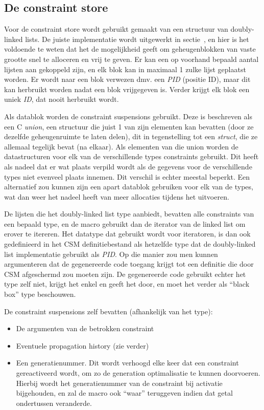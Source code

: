 \subsection{De constraint store} \label{sec:constore}

Voor de constraint store wordt gebruikt gemaakt van een structuur van doubly-linked lists. De juiste implementatie wordt uitgewerkt in sectie~\label{ssec:impl-rt-dll}, en hier is het voldoende te weten dat het de mogelijkheid geeft om geheugenblokken van vaste grootte snel te alloceren en vrij te geven. Er kan een op voorhand bepaald aantal lijsten aan gekoppeld zijn, en elk blok kan in maximaal 1 zulke lijst geplaatst worden. Er wordt naar een blok verwezen dmv. een {\em PID} (positie ID), maar dit kan herbruikt worden nadat een blok vrijgegeven is. Verder krijgt elk blok een uniek {\em ID}, dat nooit herbruikt wordt.

Als datablok worden de constraint suspensions gebruikt. Deze is beschreven als een C {\em union}, een structuur die juist 1 van zijn elementen kan bevatten (door ze dezelfde geheugenruimte te laten delen), dit in tegenstelling tot een {\em struct}, die ze allemaal tegelijk bevat (na elkaar). Als elementen van die union worden de datastructuren voor elk van de verschillende types constraints gebruikt. Dit heeft als nadeel dat er wat plaats verpild wordt als de gegevens voor de verschillende types niet evenveel plaats innemen. Dit verschil is echter meestal beperkt. Een alternatief zou kunnen zijn een apart datablok gebruiken voor elk van de types, wat dan weer het nadeel heeft van meer allocaties tijdens het uitvoeren.

De lijsten die het doubly-linked list type aanbiedt, bevatten alle constraints van een bepaald type, en de  macro gebruikt dan de iterator van de linked list om erover te itereren. Het  datatype dat gebruikt wordt voor iteratoren, is dan ook gedefinieerd in het CSM definitiebestand als hetzelfde type dat de doubly-linked list implementatie gebruikt als {\em PID}. Op die manier zou men kunnen argumenteren dat de gegenereerde code toegang krijgt tot een definitie die door CSM afgeschermd zou moeten zijn. De gegenereerde code gebruikt echter het  type zelf niet, krijgt het enkel en geeft het door, en moet het verder als ``black box'' type beschouwen.

De constraint suspensions zelf bevatten (afhankelijk van het type): \begin{itemize}
  \item De argumenten van de betrokken constraint
  \item Eventuele propagation history (zie verder)
  \item Een generatienummer. Dit wordt verhoogd elke keer dat een constraint gereactiveerd wordt, om zo de generation optimalisatie te kunnen doorvoeren. Hierbij wordt het generatienummer van de constraint bij activatie bijgehouden, en zal de  macro ook ``waar'' teruggeven indien dat getal ondertussen veranderde.
\end{itemize}

